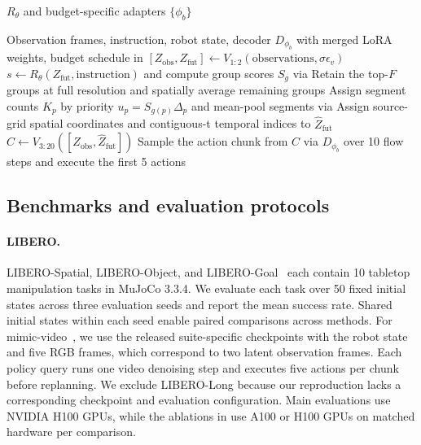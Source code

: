 \begin{algorithm}[t]
\begin{algorithmic}[1]
    \State \Return $R_\theta$ and budget-specific adapters $\{\phi_b\}$
  \end{algorithmic}
\end{algorithm}

\begin{algorithm}[t]
  \caption{Single-query inference of \method on mimic-video.}
  \label{alg:supp_infer}
  \footnotesize
  \begin{algorithmic}[1]
    \Require Observation frames, instruction, robot state, decoder $D_{\phi_b}$ with merged LoRA weights, budget schedule in 
    \State $[Z_{\text{obs}}, Z_{\text{fut}}] \gets V_{1:2}(\text{observations}, \sigma\epsilon_v)$ 
    \State $s \gets R_\theta(Z_{\text{fut}}, \text{instruction})$ and compute group scores $S_g$ via 
    \State Retain the top-$F$ groups at full resolution and spatially average remaining groups
    \State Assign segment counts $K_p$ by priority $u_p = S_{g(p)}\Delta_p$ and mean-pool segments via 
    \State Assign source-grid spatial coordinates and contiguous-t temporal indices to $\hat{Z}_{\text{fut}}$
    \State $C \gets V_{3:20}([Z_{\text{obs}}, \hat{Z}_{\text{fut}}])$ 
    \State Sample the action chunk from $C$ via $D_{\phi_b}$ over 10 flow steps and execute the first 5 actions
  \end{algorithmic}
\end{algorithm}

\subsection{Benchmarks and evaluation protocols}
\label{app:supp_benchmarks}

\paragraph{LIBERO.}
LIBERO-Spatial, LIBERO-Object, and LIBERO-Goal~\cite{liu2023libero} each contain 10 tabletop manipulation tasks in MuJoCo 3.3.4.
We evaluate each task over 50 fixed initial states across three evaluation seeds and report the mean success rate.
Shared initial states within each seed enable paired comparisons across methods.
For mimic-video~\cite{pai2025mimicvideo}, we use the released suite-specific checkpoints with the robot state and five RGB frames, which correspond to two latent observation frames.
Each policy query runs one video denoising step and executes five actions per chunk before replanning.
We exclude LIBERO-Long because our reproduction lacks a corresponding checkpoint and evaluation configuration.
Main evaluations use NVIDIA H100 GPUs, while the ablations in  use A100 or H100 GPUs on matched hardware per comparison.


